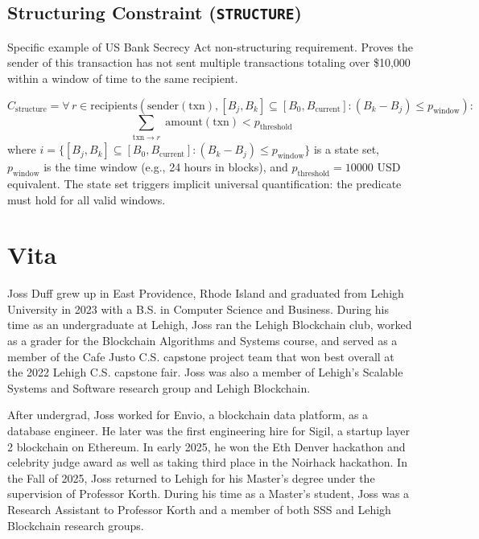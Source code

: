 \documentclass[9pt]{extreport}
\begin{document}
\section{Structuring Constraint (\texttt{STRUCTURE})} Specific example of US Bank Secrecy Act non-structuring requirement. Proves the sender of this transaction has not sent multiple transactions totaling over \$10,000 within a window of time to the same recipient.

$$
C_{\text{structure}} = \forall \, r \in \text{recipients}(\text{sender}(\text{txn}), [B_j, B_k] \subseteq [B_0, B_{\text{current}}] : (B_k - B_j) \leq p_{\text{window}}) :
$$
$$
\sum_{\substack{\text{txn} \to r}} \text{amount}(\text{txn}) < p_{\text{threshold}}
$$
where $i = \{[B_j, B_k] \subseteq [B_0, B_{\text{current}}] : (B_k - B_j) \leq p_{\text{window}}\}$ is a state set, $p_{\text{window}}$ is the time window (e.g., 24 hours in blocks), and $p_{\text{threshold}} = 10000$ USD equivalent. The state set triggers implicit universal quantification: the predicate must hold for all valid windows.

\chapter*{Vita}

Joss Duff grew up in East Providence, Rhode Island and graduated from Lehigh University in 2023 with a B.S. in Computer Science and Business.  During his time as an undergraduate at Lehigh, Joss ran the Lehigh Blockchain club, worked as a grader for the Blockchain Algorithms and Systems course, and served as a member of the Cafe Justo C.S. capstone project team that won best overall at the 2022 Lehigh C.S. capstone fair.  Joss was also a member of Lehigh's Scalable Systems and Software research group and Lehigh Blockchain. 

After undergrad, Joss worked for Envio, a blockchain data platform, as a database engineer.  He later was the first engineering hire for Sigil, a startup layer 2 blockchain on Ethereum.  In early 2025, he won the Eth Denver hackathon and celebrity judge award as well as taking third place in the Noirhack hackathon.  In the Fall of 2025, Joss returned to Lehigh for his Master's degree under the supervision of Professor Korth.  During his time as a Master's student, Joss was a Research Assistant to Professor Korth and a member of both SSS and Lehigh Blockchain research groups.
\end{document}
